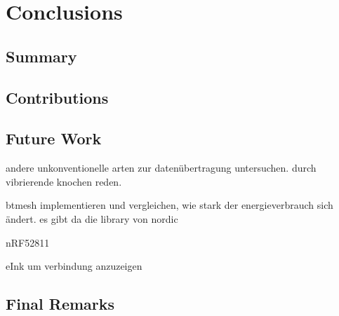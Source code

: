 \chapter{Conclusions}
\label{ch:closure}

\section{Summary}

\section{Contributions}

\section{Future Work}
andere unkonventionelle arten zur datenübertragung untersuchen. durch vibrierende knochen reden.

btmesh implementieren und vergleichen, wie stark der energieverbrauch sich ändert. es gibt da die library von nordic

nRF52811

eInk um verbindung anzuzeigen
\section{Final Remarks}
